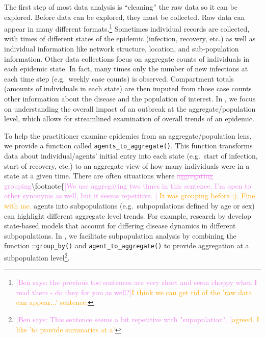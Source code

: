 \documentclass[
  shortnames]{jss}
\begin{document}
The first step of most data analysis is ``cleaning'' the raw data so it
can be explored. Before data can be explored, they must be collected.
Raw data can appear in many different
formats.\footnote{\textcolor{violet}{[Ben says: the previous too sentences are very short and seem choppy when I read them - do they for you as well?]}\textcolor{orange}{I think we can get rid of the 'raw data can appear...' sentence.}}
Sometimes individual records are collected, with times of different
states of the epidemic (infection, recovery, etc.) as well as individual
information like network structure, location, and sub-population
information. Other data collections focus on aggregate counts of
individuals in each epidemic state. In fact, many times only the number
of new infections at each time step (e.g.~weekly case counts) is
observed. Compartment totals (amounts of individuals in each state) are
then imputed from those case counts other information about the disease
and the population of interest. In , we focus on
understanding the overall impact of an outbreak at the
aggregate/population level, which allows for streamlined examination of
overall trends of an epidemic.

To help the practitioner examine epidemics from an aggregate/population
lens, we provide a function called \texttt{agents\_to\_aggregate()}.
This function transforms data about individual/agents' initial entry
into each state (e.g.~start of infection, start of recovery, etc.) to an
aggregate view of how many individuals were in a state at a given time.
There are often situations where
\textcolor{violet}{\sout{aggregating} grouping}\textbackslash footnote\{\textcolor{violet}{[We use aggregating two times in this sentence. I'm open to other synonyms as well, but it seems repetitive. ]}
\textcolor{orange}{It was grouping before ;).  Fine with me.} agents
into subpopulations (e.g.~subpopulations defined by age or sex) can
highlight different aggregate level trends. For example, research by
\citet{rvachev1985,anderson1992,worby2015} develop state-based models
that account for differing disease dynamics in different subpopulations.
In , we facilitate subpopulation analysis by combining
the function ::\texttt{group\_by()} and
\texttt{agent\_to\_aggregate()} to provide aggregation at a
subpopulation
level\footnote{\textcolor{violet}{[Ben says: This sentence seems a bit repetitive with "supopulation". ]}\textcolor{orange}{agreed.  I like 'to provide summaries at a'}}.
\end{document}
